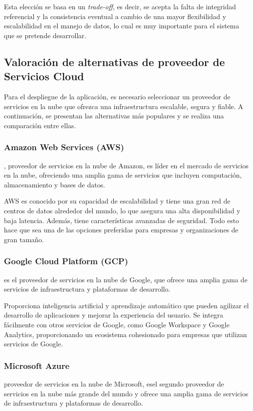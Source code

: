 Esta elección se basa en un \textit{trade-off}, es decir, se acepta la falta de integridad referencial y la consistencia eventual a cambio de una mayor flexibilidad y escalabilidad en el manejo de datos, 
lo cual es muy importante para el sistema que se pretende desarrollar.


\subsection{Valoración de alternativas de proveedor de Servicios Cloud}
Para el despliegue de la aplicación, es necesario seleccionar un proveedor de servicios en la nube que ofrezca una infraestructura escalable, segura y fiable. 
A continuación, se presentan las alternativas más populares y se realiza una comparación entre ellas.


\subsubsection{Amazon Web Services (AWS)}
, proveedor de servicios en la nube de Amazon, es líder en el mercado de servicios en la nube, ofreciendo una amplia gama de servicios 
que incluyen computación, almacenamiento y bases de datos. 

AWS es conocido por su capacidad de escalabilidad y tiene una gran red de centros de datos alrededor del mundo, 
lo que asegura una alta disponibilidad y baja latencia.  
Además, tiene características avanzadas de seguridad.
Todo esto hace que sea una de las opciones preferidas para empresas y organizaciones de gran tamaño.

\subsubsection{Google Cloud Platform (GCP)}
  es el proveedor de servicios en la nube de Google, que ofrece una amplia gama de servicios de infraestructura y plataformas de desarrollo.

Proporciona inteligencia artificial y aprendizaje automático que pueden agilizar el desarrollo de aplicaciones y mejorar la experiencia del usuario.
Se integra fácilmente con otros servicios de Google, como Google Workspace y Google Analytics, proporcionando un ecosistema cohesionado para empresas que utilizan servicios de Google.


\subsubsection{Microsoft Azure}
 proveedor de servicios en la nube de Microsoft, esel segundo proveedor de servicios en la nube más grande del mundo 
y ofrece una amplia gama de servicios de infraestructura y plataformas de desarrollo.

